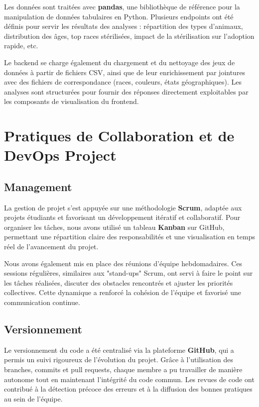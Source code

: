 \documentclass[a4paper,12pt]{article}
\begin{document}
Les données sont traitées avec \textbf{pandas}, une bibliothèque de référence pour la manipulation de données tabulaires en Python. Plusieurs endpoints ont été définis pour servir les résultats des analyses : répartition des types d’animaux, distribution des âges, top races stérilisées, impact de la stérilisation sur l’adoption rapide, etc.

Le backend se charge également du chargement et du nettoyage des jeux de données à partir de fichiers CSV, ainsi que de leur enrichissement par jointures avec des fichiers de correspondance (races, couleurs, états géographiques). Les analyses sont structurées pour fournir des réponses directement exploitables par les composants de visualisation du frontend.

\section {Pratiques de Collaboration et de DevOps Project}

\subsection {Management}

La gestion de projet s’est appuyée sur une méthodologie \textbf{Scrum}, adaptée aux projets étudiants et favorisant un développement itératif et collaboratif. Pour organiser les tâches, nous avons utilisé un tableau \textbf{Kanban} sur GitHub, permettant une répartition claire des responsabilités et une visualisation en temps réel de l’avancement du projet.

Nous avons également mis en place des réunions d’équipe hebdomadaires. Ces sessions régulières, similaires aux "stand-ups" Scrum, ont servi à faire le point sur les tâches réalisées, discuter des obstacles rencontrés et ajuster les priorités collectives. Cette dynamique a renforcé la cohésion de l’équipe et favorisé une communication continue.

\subsection {Versionnement}

Le versionnement du code a été centralisé via la plateforme \textbf{GitHub}, qui a permis un suivi rigoureux de l’évolution du projet. Grâce à l’utilisation des branches, commits et pull requests, chaque membre a pu travailler de manière autonome tout en maintenant l'intégrité du code commun. Les revues de code ont contribué à la détection précoce des erreurs et à la diffusion des bonnes pratiques au sein de l’équipe.
\end{document}
